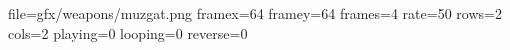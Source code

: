 file=gfx/weapons/muzgat.png
framex=64
framey=64
frames=4
rate=50
rows=2
cols=2
playing=0
looping=0
reverse=0
